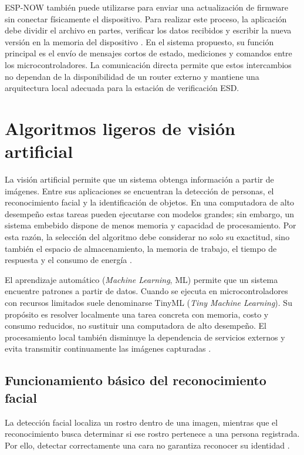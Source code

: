 ESP-NOW también puede utilizarse para enviar una actualización de firmware sin
conectar físicamente el dispositivo. Para realizar este proceso, la aplicación
debe dividir el archivo en partes, verificar los datos recibidos y escribir la
nueva versión en la memoria del dispositivo \cite{ESPNOWGUIDE}. En el sistema
propuesto, su función principal es el envío de
mensajes cortos de estado, mediciones y comandos entre los microcontroladores.
La comunicación directa permite que estos intercambios no dependan de la
disponibilidad de un router externo y mantiene una arquitectura local adecuada
para la estación de verificación ESD.

\section{Algoritmos ligeros de visión artificial}

La visión artificial permite que un sistema obtenga información a partir de
imágenes. Entre sus aplicaciones se encuentran la detección de personas, el
reconocimiento facial y la identificación de objetos. En una computadora de
alto desempeño estas tareas pueden ejecutarse con modelos grandes; sin embargo,
un sistema embebido dispone de menos memoria y capacidad de procesamiento. Por
esta razón, la selección del algoritmo debe considerar no solo su exactitud,
sino también el espacio de almacenamiento, la memoria de trabajo, el tiempo de
respuesta y el consumo de energía \cite{TinyMLReview2022,MCUNet2020}.

El aprendizaje automático (\textit{Machine Learning}, ML) permite que un sistema
encuentre patrones a partir de datos. Cuando se ejecuta en microcontroladores
con recursos limitados suele denominarse TinyML (\textit{Tiny Machine
Learning}). Su propósito es resolver localmente una tarea concreta con memoria,
costo y consumo reducidos, no sustituir una computadora de alto desempeño. El
procesamiento local también disminuye la dependencia de servicios externos y
evita transmitir continuamente las imágenes capturadas
\cite{TinyMLReview2022}.

\subsection{Funcionamiento básico del reconocimiento facial}

La detección facial localiza un rostro dentro de una imagen, mientras que el
reconocimiento busca determinar si ese rostro pertenece a una persona
registrada. Por ello, detectar correctamente una cara no garantiza reconocer su
identidad \cite{Shepley2019FaceRecognition}.


